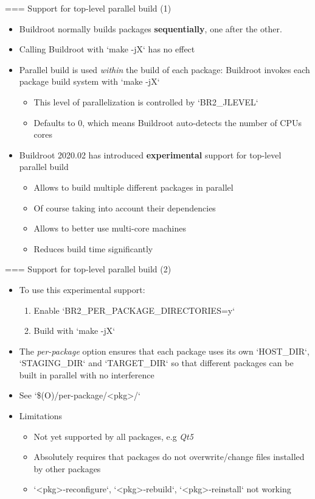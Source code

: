 === {Support for top-level parallel build (1)}
  \begin{itemize}
  \item Buildroot normally builds packages {\bf sequentially}, one after the
    other.
  \item Calling Buildroot with `make -jX` has no effect
  \item Parallel build is used {\em within} the build of each package:
    Buildroot invokes each package build system with `make -jX`
    \begin{itemize}
    \item This level of parallelization is controlled by
      `BR2_JLEVEL`
    \item Defaults to 0, which means Buildroot auto-detects the number
      of CPUs cores
    \end{itemize}
  \item Buildroot 2020.02 has introduced {\bf experimental} support
    for top-level parallel build
    \begin{itemize}
    \item Allows to build multiple different packages in parallel
    \item Of course taking into account their dependencies
    \item Allows to better use multi-core machines
    \item Reduces build time significantly
    \end{itemize}
  \end{itemize}


=== {Support for top-level parallel build (2)}
  \begin{itemize}
  \item To use this experimental support:
    \begin{enumerate}
    \item Enable `BR2_PER_PACKAGE_DIRECTORIES=y`
    \item Build with `make -jX`
    \end{enumerate}
  \item The {\em per-package} option ensures that each package uses
    its own `HOST_DIR`, `STAGING_DIR` and `TARGET_DIR`
    so that different packages can be built in parallel with no
    interference
  \item See `\$(O)/per-package/<pkg>/`
  \item Limitations
    \begin{itemize}
    \item Not yet supported by all packages, e.g {\em Qt5}
    \item Absolutely requires that packages do not overwrite/change
      files installed by other packages
    \item `<pkg>-reconfigure`, `<pkg>-rebuild`,
      `<pkg>-reinstall` not working
    \end{itemize}
  \end{itemize}


